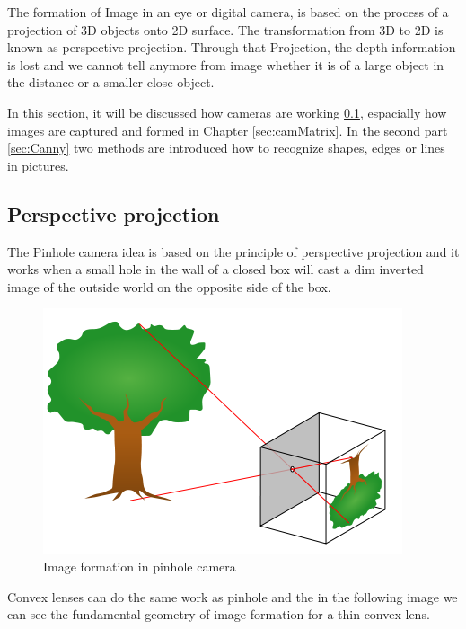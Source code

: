 \documentclass[journal,final,a4paper,twoside]{PS}
\begin{document}
The formation of Image in an eye or digital camera, is based on the process of a projection of 3D objects onto 2D surface. The transformation from 3D to 2D is known as perspective projection. Through that Projection, the depth information is lost and we cannot tell anymore from image whether it is of a large object in the distance or a smaller close object.

In this section, it will be discussed how cameras are working \ref{sec:projection}, espacially how images are captured and formed in Chapter \ref{sec:camMatrix}. In the second part \ref{sec:Canny} two methods are introduced how to recognize shapes, edges or lines in pictures.

\subsection{Perspective projection}
\label{sec:projection}
The Pinhole camera idea is based on the principle of perspective projection and it works when a small hole in the wall of a closed box will cast a dim inverted image of the outside world on the opposite side of the box.
\begin{figure}[h]
\begin{center}
\includegraphics[scale=0.4]{./pics/pinhole.png}
\caption{Image formation in pinhole camera}
\label{fig:pinhole}
\end{center}
\end{figure}
Convex lenses can do the same work as pinhole and the in the following image we can see the fundamental geometry of image formation for a thin convex lens.
\end{document}
